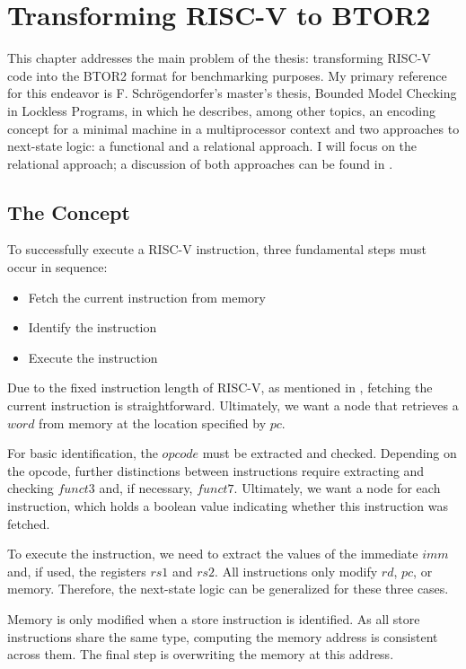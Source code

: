 \chapter{Transforming RISC-V to BTOR2}\label{chap:riscv_to_btor2}

This chapter addresses the main problem of the thesis: transforming RISC-V code
into the BTOR2 format for benchmarking purposes. My primary reference for this
endeavor is F. Schrögendorfer's master's thesis, \dq Bounded Model Checking in
Lockless Programs\dq \cite{bmcOfLockless}, in which he describes, among other
topics, an encoding concept for a minimal machine in a multiprocessor context
\cite[Chapter 2]{bmcOfLockless} and two approaches to next-state logic: a
functional \cite[Chapter 6]{bmcOfLockless} and a relational \cite[Chapter
    7]{bmcOfLockless} approach. I will focus on the relational approach; a
discussion of both approaches can be found in .

\section{The Concept}
To successfully execute a RISC-V instruction, three fundamental steps must
occur in sequence:
\begin{itemize}
    \item Fetch the current instruction from memory
    \item Identify the instruction
    \item Execute the instruction
\end{itemize}
Due to the fixed instruction length of RISC-V, as mentioned in , fetching the current instruction is straightforward. Ultimately, we want a node that retrieves a $word$ from memory at the location specified by $pc$.

For basic identification, the $opcode$ must be extracted and checked. Depending
on the opcode, further distinctions between instructions require extracting and
checking $funct3$ and, if necessary, $funct7$. Ultimately, we want a node for
each instruction, which holds a boolean value indicating whether this
instruction was fetched.

To execute the instruction, we need to extract the values of the immediate
$imm$ and, if used, the registers $rs1$ and $rs2$. All instructions only modify
$rd$, $pc$, or memory. Therefore, the next-state logic can be generalized for
these three cases.

Memory is only modified when a store instruction is identified. As all store
instructions share the same type, computing the memory address is consistent
across them. The final step is overwriting the memory at this address.

